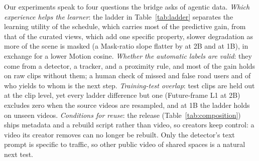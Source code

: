 \documentclass[letterpaper]{article} %
\begin{document}
Our experiments speak to four questions the bridge asks of agentic data. \emph{Which experience helps the learner}: the ladder in Table~\ref{tab:ladder} separates the learning utility of the schedule, which carries most of the predictive gain, from that of the curated views, which add one specific property, slower degradation as more of the scene is masked (a Mask-ratio slope flatter by \nLadderMaskTwoB{} at 2B and \nLadderMaskOneB{} at 1B), in exchange for a lower Motion cosine. \emph{Whether the automatic labels are valid}: they come from a detector, a tracker, and a proximity rule, and most of the gain holds on raw clips without them; a human check of missed and false road users and of who yields to whom is the next step. \emph{Training-test overlap}: test clips are held out at the clip level, yet every ladder difference but one (Future-frame L1 at 2B) excludes zero when the \nTestVideos{} source videos are resampled, and at 1B the ladder holds on \nHeldoutVideos{} unseen videos. \emph{Conditions for reuse}: the release (Table~\ref{tab:composition}) ships metadata and a rebuild script rather than video, so creators keep control: a video its creator removes can no longer be rebuilt. Only the detector's text prompt is specific to traffic, so other public video of shared spaces is a natural next test.



\clearpage  %
{\small

}
\end{document}
